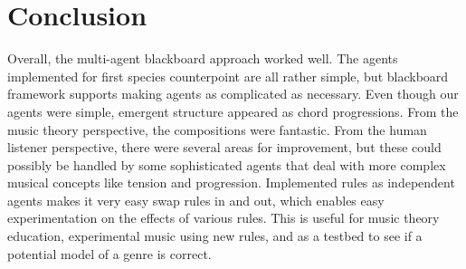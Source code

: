 \section{Conclusion}

Overall, the multi-agent blackboard approach worked well.
The agents implemented for first species counterpoint are all rather simple, but blackboard framework supports making agents as complicated as necessary.
Even though our agents were simple, emergent structure appeared as chord progressions.
From the music theory perspective, the compositions were fantastic.
From the human listener perspective, there were several areas for improvement, 
but these could possibly be handled by some sophisticated agents that deal with more complex musical concepts like tension and progression.
Implemented rules as independent agents makes it very easy swap rules in and out, which enables easy experimentation on the effects of various rules.
This is useful for music theory education, experimental music using new rules, and as a testbed to see if a potential model of a genre is correct.
